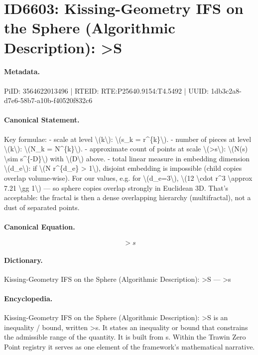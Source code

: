 \section*{ID6603: Kissing-Geometry IFS on the Sphere (Algorithmic Description): >S}
\paragraph{Metadata.}
PiID: 3564622013496 | RTEID: RTE:P25640.9154:T4.5492 | UUID: 1db3c2a8-d7e6-58b7-a10b-f40520f832c6

\paragraph{Canonical Statement.}
Key formulae: - scale at level \textbackslash{}(k\textbackslash{}): \textbackslash{}(s\_k = r\textasciicircum{}\{k\}\textbackslash{}). - number of pieces at level \textbackslash{}(k\textbackslash{}): \textbackslash{}(N\_k = N\textasciicircum{}\{k\}\textbackslash{}). - approximate count of points at scale \textbackslash{}(>s\textbackslash{}): \textbackslash{}(N(s) \textbackslash{}sim s\textasciicircum{}\{-D\}\textbackslash{}) with \textbackslash{}(D\textbackslash{}) above. - total linear measure in embedding dimension \textbackslash{}(d\_e\textbackslash{}): if \textbackslash{}(N r\textasciicircum{}\{d\_e\} > 1\textbackslash{}), disjoint embedding is impossible (child copies overlap volume-wise). For our values, e.g. for \textbackslash{}(d\_e=3\textbackslash{}), \textbackslash{}(12 \textbackslash{}cdot r\textasciicircum{}3 \textbackslash{}approx 7.21 \textbackslash{}gg 1\textbackslash{}) — so sphere copies overlap strongly in Euclidean 3D. That’s acceptable: the fractal is then a dense overlapping hierarchy (multifractal), not a dust of separated points.

\paragraph{Canonical Equation.}
\[
>s
\]

\paragraph{Dictionary.}
Kissing-Geometry IFS on the Sphere (Algorithmic Description): >S — >s

\paragraph{Encyclopedia.}
Kissing-Geometry IFS on the Sphere (Algorithmic Description): >S is an inequality / bound, written >s. It states an inequality or bound that constrains the admissible range of the quantity. It is built from s. Within the Trawin Zero Point registry it serves as one element of the framework's mathematical narrative.
